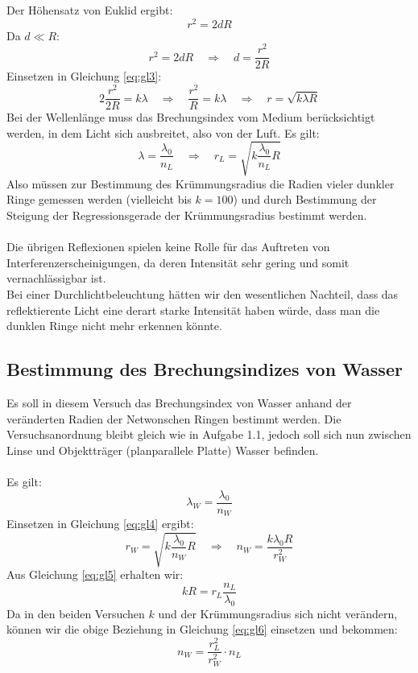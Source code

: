 \documentclass[a4paper,titlepage]{scrartcl}
\numberwithin{equation}{section}
\begin{document}
Der Höhensatz von Euklid \cite{wiki:euklid} ergibt:
\begin{equation*}
r^2=2dR
\end{equation*}
Da $d \ll R$:
\begin{equation*}
r^2=2dR \quad \Rightarrow \quad d=\frac{r^2}{2R}
\end{equation*}
Einsetzen in Gleichung \ref{eq:gl3}:
\begin{equation}
\label{eq:gl5}
2 \frac{r^2}{2R}=k \lambda \quad \Rightarrow \quad \frac{r^2}{R}=k \lambda \quad \Rightarrow \quad r=\sqrt{k \lambda R}
\end{equation}
Bei der Wellenlänge muss das Brechungsindex vom Medium berücksichtigt werden, in dem Licht sich ausbreitet, also von der Luft. Es gilt:
\begin{equation}
\label{eq:gl4}
\lambda=\frac{\lambda_0}{n_L} \quad \Rightarrow \quad r_L=\sqrt{k \frac{\lambda_0}{n_L} R}
\end{equation}
Also müssen zur Bestimmung des Krümmungsradius die Radien vieler dunkler Ringe gemessen werden (vielleicht bis $k=100$) und durch Bestimmung der Steigung der Regressionsgerade der Krümmungsradius bestimmt werden.\\ \\
Die übrigen Reflexionen spielen keine Rolle für das Auftreten von Interferenzerscheinigungen, da deren Intensität sehr gering und somit vernachlässigbar ist.\\
Bei einer Durchlichtbeleuchtung hätten wir den wesentlichen Nachteil, dass das reflektierente Licht eine derart starke Intensität haben würde, dass man die dunklen Ringe nicht mehr erkennen könnte.
\subsection{Bestimmung des Brechungsindizes von Wasser}
Es soll in diesem Versuch das Brechungsindex von Wasser anhand der veränderten Radien der Netwonschen Ringen bestimmt werden. Die Versuchsanordnung bleibt gleich wie in Aufgabe 1.1, jedoch soll sich nun zwischen Linse und Objektträger (planparallele Platte) Wasser befinden.\\ \\
Es gilt:
\begin{equation*}
\lambda_{W}=\frac{\lambda_0}{n_{W}}
\end{equation*}
Einsetzen in Gleichung \ref{eq:gl4} ergibt:
\begin{equation}
\label{eq:gl6}
r_{W}=\sqrt{k \frac{\lambda_0}{n_{W}} R} \quad \Rightarrow \quad n_{W}=\frac{k \lambda_0 R}{r_{W}^2}
\end{equation}
Aus Gleichung \ref{eq:gl5} erhalten wir:
\begin{equation*}
k R = r_L \frac{n_L}{\lambda_0}
\end{equation*}
Da in den beiden Versuchen $k$ und der Krümmungsradius sich nicht verändern, können wir die obige Beziehung in Gleichung \ref{eq:gl6} einsetzen und bekommen:
\begin{equation*}
n_{W}=\frac{r_L^2}{r_W^2} \cdot n_L
\end{equation*}
\end{document}
